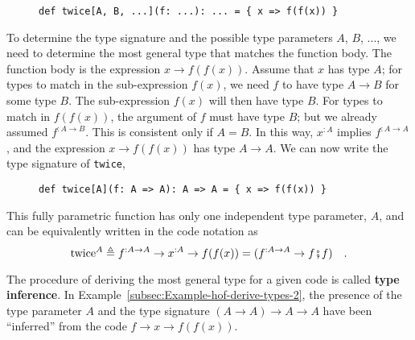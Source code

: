 \begin{wrapfigure}{l}{0.525\columnwidth}%
\vspace{-0.75\baselineskip}
\begin{lstlisting}
def twice[A, B, ...](f: ...): ... = { x => f(f(x)) }
\end{lstlisting}
\vspace{-1\baselineskip}
\end{wrapfigure}%

\noindent To determine the type signature and the possible type parameters
$A$, $B$, ..., we need to determine the most general type that matches
the function body. The function body is the expression $x\rightarrow f(f(x))$.
Assume that $x$ has type $A$; for types to match in the sub-expression
$f(x)$, we need $f$ to have type $A\rightarrow B$ for some type
$B$. The sub-expression $f(x)$ will then have type $B$. For types
to match in $f(f(x))$, the argument of $f$ must have type $B$;
but we already assumed $f^{:A\rightarrow B}$. This is consistent
only if $A=B$. In this way, $x^{:A}$ implies $f^{:A\rightarrow A}$,
and the expression $x\rightarrow f(f(x))$ has type $A\rightarrow A$.
We can now write the type signature of \lstinline!twice!,

\begin{wrapfigure}{l}{0.51\columnwidth}%
\vspace{-0.75\baselineskip}
\begin{lstlisting}
def twice[A](f: A => A): A => A = { x => f(f(x)) }
\end{lstlisting}
\vspace{-0.95\baselineskip}
\end{wrapfigure}%

\noindent This fully parametric function has only one independent
type parameter, $A$, and can be equivalently written in the code
notation as 
\begin{equation}
\text{twice}^{A}\triangleq f^{:A\rightarrow A}\rightarrow x^{:A}\rightarrow f(f(x))=(f^{:A\rightarrow A}\rightarrow f\bef f)\quad.\label{eq:hof-def-of-twice-in-math-notation}
\end{equation}

The procedure of deriving the most general type for a given code is
called \textbf{type inference}. In Example~\ref{subsec:Example-hof-derive-types-2},
the presence of the type parameter $A$ and the type signature $\left(A\rightarrow A\right)\rightarrow A\rightarrow A$
have been ``inferred'' from the code $f\rightarrow x\rightarrow f(f(x))$.

